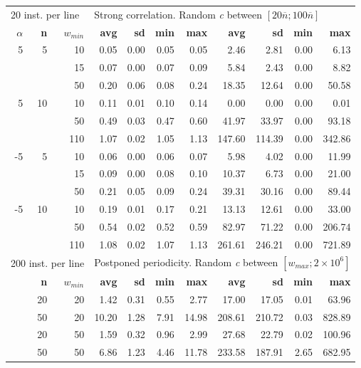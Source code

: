 \documentclass[runningheads,a4paper]{llncs}
\begin{document}
\begin{table}
\begin{tabular}{@{\extracolsep{4pt}}rrrrrrrrrrr@{}}
\multicolumn{3}{l}{20 inst. per line} & \multicolumn{8}{l}{Strong correlation. Random \emph{c} between \([20\overline{n}; 100\overline{n}]\)}\\
\cline{1-3}\cline{4-11}
\textbf{\(\alpha\)} & \textbf{n} & \(w_{min}\) & \textbf{avg} & \textbf{sd} & \textbf{min} & \textbf{max} & \textbf{avg} & \textbf{sd} & \textbf{min} & \textbf{max}\\
\cline{1-3}\cline{4-7}\cline{8-11}
 5 & 5  & 10 & 0.05 & 0.00 & 0.05 & 0.05 & 2.46 & 2.81 & 0.00 & 6.13\\
   &    & 15 & 0.07 & 0.00 & 0.07 & 0.09 & 5.84 & 2.43 & 0.00 & 8.82\\
   &    & 50 & 0.20 & 0.06 & 0.08 & 0.24 & 18.35 & 12.64 & 0.00 & 50.58\\
 5 & 10 & 10 & 0.11 & 0.01 & 0.10 & 0.14 & 0.00 & 0.00 & 0.00 & 0.01\\
   &    & 50 & 0.49 & 0.03 & 0.47 & 0.60 & 41.97 & 33.97 & 0.00 & 93.18\\
   &    & 110 & 1.07 & 0.02 & 1.05 & 1.13 & 147.60 & 114.39 & 0.00 & 342.86\\
-5 & 5  & 10 & 0.06 & 0.00 & 0.06 & 0.07 & 5.98 & 4.02 & 0.00 & 11.99\\
   &    & 15 & 0.09 & 0.00 & 0.08 & 0.10 & 10.37 & 6.73 & 0.00 & 21.00\\
   &    & 50 & 0.21 & 0.05 & 0.09 & 0.24 & 39.31 & 30.16 & 0.00 & 89.44\\
-5 & 10 & 10 & 0.19 & 0.01 & 0.17 & 0.21 & 13.13 & 12.61 & 0.00 & 33.00\\
   &    & 50 & 0.54 & 0.02 & 0.52 & 0.59 & 82.97 & 71.22 & 0.00 & 206.74\\
   &    & 110& 1.08 & 0.02 & 1.07 & 1.13 & 261.61 & 246.21 & 0.00 & 721.89\\
\hline

\multicolumn{3}{l}{200 inst. per line} & \multicolumn{8}{l}{Postponed periodicity. Random \emph{c} between \([w_{max}; 2\times10^6]\)}\\
\cline{1-3}\cline{4-11}
& \textbf{n} & \(w_{min}\) & \textbf{avg} & \textbf{sd} & \textbf{min} & \textbf{max} & \textbf{avg} & \textbf{sd} & \textbf{min} & \textbf{max}\\
\cline{1-3}\cline{4-7}\cline{8-11}
& 20 & 20 & 1.42 & 0.31 & 0.55 & 2.77 & 17.00 & 17.05 & 0.01 & 63.96\\
& 50 & 20 & 10.20 & 1.28 & 7.91 & 14.98 & 208.61 & 210.72 & 0.03 & 828.89\\
& 20 & 50 & 1.59 & 0.32 & 0.96 & 2.99 & 27.68 & 22.79 & 0.02 & 100.96\\
& 50 & 50 & 6.86 & 1.23 & 4.46 & 11.78 & 233.58 & 187.91 & 2.65 & 682.95\\
\hline


\end{tabular}
\end{table}
\end{document}
